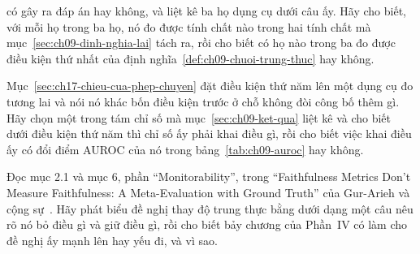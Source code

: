 \begin{cauhoids}
có gây ra đáp án hay không, và liệt kê ba họ dụng cụ dưới câu ấy. Hãy cho biết,
với mỗi họ trong ba họ, nó đo được tính chất nào trong hai tính chất mà
mục~\ref{sec:ch09-dinh-nghia-lai} tách ra, rồi cho biết có họ nào trong ba đo
được điều kiện thứ nhất của định nghĩa~\ref{def:ch09-chuoi-trung-thuc} hay không.
  \item Mục~\ref{sec:ch17-chieu-cua-phep-chuyen} đặt điều kiện thứ năm lên một
dụng cụ đo tương lai và nói nó khác bốn điều kiện trước ở chỗ không đòi công bố
thêm gì. Hãy chọn một trong tám chỉ số mà mục~\ref{sec:ch09-ket-qua} liệt kê và
cho biết dưới điều kiện thứ năm thì chỉ số ấy phải khai điều gì, rồi cho biết
việc khai điều ấy có đổi điểm AUROC của nó trong bảng~\ref{tab:ch09-auroc} hay
không.
  \item Đọc mục 2.1 và mục 6, phần \enquote{Monitorability}, trong
\enquote{Faithfulness Metrics Don't Measure Faithfulness: A Meta-Evaluation with
Ground Truth} của Gur-Arieh và cộng sự~\autocite{p21metrics}. Hãy phát biểu đề
nghị thay độ trung thực bằng 
dưới dạng một câu nêu rõ nó bỏ
điều gì và giữ điều gì, rồi cho biết bảy chương của Phần~IV có làm cho đề nghị ấy
mạnh lên hay yếu đi, và vì sao.
\end{cauhoids}
